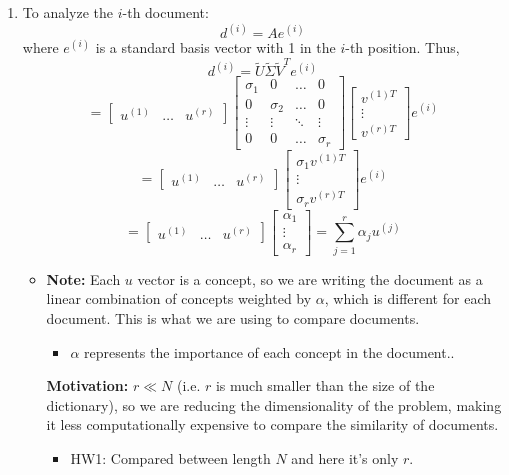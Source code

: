 \begin{intuition}
\begin{enumerate}
        \item To analyze the \( i \)-th document:
        \[
        d^{(i)} = A e^{(i)} 
        \]
        where \( e^{(i)} \) is a standard basis vector with 1 in the \( i \)-th position. Thus,
        \[
        d^{(i)} = \tilde{U} \tilde{\Sigma} \tilde{V}^T e^{(i)}
        \]
        \[
        = \begin{bmatrix} u^{(1)} & \ldots & u^{(r)} \end{bmatrix}
        \begin{bmatrix}
        \sigma_1 & 0 & \ldots & 0 \\
        0 & \sigma_2 & \ldots & 0 \\
        \vdots & \vdots & \ddots & \vdots \\
        0 & 0 & \ldots & \sigma_r
        \end{bmatrix}
        \begin{bmatrix} v^{(1)T} \\ \vdots \\ v^{(r)T} \end{bmatrix} e^{(i)}
        \]
        \[
        = \begin{bmatrix} u^{(1)} & \ldots & u^{(r)} \end{bmatrix}
        \begin{bmatrix} \sigma_1 v^{(1)T} \\ \vdots \\ \sigma_r v^{(r)T} \end{bmatrix} e^{(i)}
        \]
        \[
        = \begin{bmatrix} u^{(1)} & \ldots & u^{(r)} \end{bmatrix}
        \begin{bmatrix} \alpha_1 \\ \vdots \\ \alpha_r \end{bmatrix}
        = \sum_{j=1}^{r} \alpha_j u^{(j)}
        \]
        \begin{itemize}
            \item \textbf{Note:} Each $u$ vector is a concept, so we are writing the document as a linear combination of concepts weighted by $\alpha$, which is different for each document. This is what we are using to compare documents.
            \begin{itemize}
                \item $\alpha$ represents the importance of each concept in the document..
            \end{itemize}
            \textbf{Motivation:} $r \ll N$ (i.e. $r$ is much smaller than the size of the dictionary), so we are reducing the dimensionality of the problem, making it less computationally expensive to compare the similarity of documents. 
            \begin{itemize}
                \item HW1: Compared between length $N$ and here it's only $r$.
            \end{itemize}
        \end{itemize}
    

\end{enumerate}
\end{intuition}

